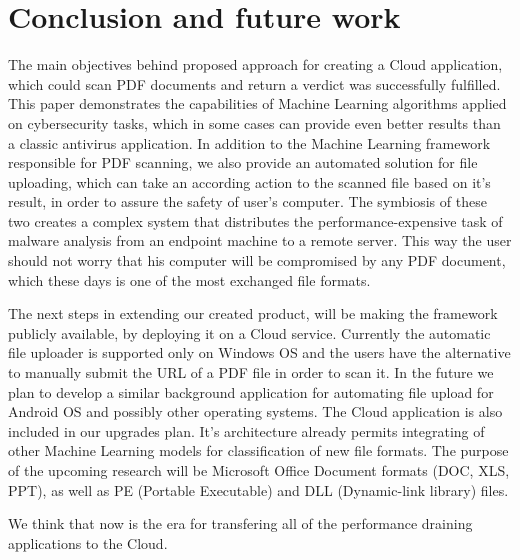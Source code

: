 \chapter{Conclusion and future work}
\label{chapter:conclusion}

The main objectives behind proposed approach for creating a Cloud application, which could scan PDF documents and return a verdict was successfully fulfilled. This paper demonstrates the capabilities of Machine Learning algorithms applied on cybersecurity tasks, which in some cases can provide even better results than a classic antivirus application. In addition to the Machine Learning framework responsible for PDF scanning, we also provide an automated solution for file uploading, which can take an according action to the scanned file based on it's result, in order to assure the safety of user's computer. The symbiosis of these two creates a complex system that distributes the performance-expensive task of malware analysis from an endpoint machine to a remote server. This way the user should not worry that his computer will be compromised by any PDF document, which these days is one of the most exchanged file formats. \par 
The next steps in extending our created product, will be making the framework publicly available, by deploying it on a Cloud service. Currently the automatic file uploader is supported only on Windows OS and the users have the alternative to manually submit the URL of a PDF file in order to scan it. In the future we plan to develop a similar background application for automating file upload for Android OS and possibly other operating systems. The Cloud application is also included in our upgrades plan. It's architecture already permits integrating of other Machine Learning models for classification of new file formats. The purpose of the upcoming research will be Microsoft Office Document formats (DOC, XLS, PPT), as well as PE (Portable Executable) and DLL (Dynamic-link library) files. \par
We think that now is the era for transfering all of the performance draining applications to the Cloud.